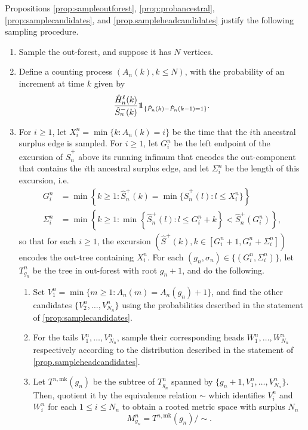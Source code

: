 Propositions \ref{prop:sampleoutforest}, \ref{prop:probancestral}, \ref{prop:samplecandidates}, and \ref{prop.sampleheadcandidates} justify the following sampling procedure.
\begin{enumerate}
    \item Sample the out-forest, and suppose it has $N$ vertices.
    \item Define a counting process $(A_n(k),k\leq N)$, with the probability of an increment at time $k$ given by $$\frac{\hat{H}_n^\ell(k)}{\hat{S}_n^-(k)}\one_{\{\hat{P}_n(k)-\hat{P}_n(k-1)=1\}}.$$
    \item For $i\geq 1$, let $X_i^n=\min\{k:A_n(k)=i\}$ be the time that the $i$th ancestral surplus edge is sampled. For $i\geq 1$, let $G_i^n$ be the left endpoint of the excursion of $\hat{S}^{+}_n$ above its running infimum that encodes the out-component that contains the $i$th ancestral surplus edge, and let $\Sigma_i^n$ be the length of this excursion, i.e. 
\begin{align*}G_i^n&=\min\left\{k\geq 1:\hat{S}^{+}_n(k)=\min\{\hat{S}^{+}_n(l):l\leq X_i^n\}\right\}\\
\Sigma_i^n&=\min\left\{k \geq 1: \min\left\{\hat{S}^{+}_n(l):l\leq G_i^n+k\right\} < \hat{S}^{+}_n(G^n_i)\right\},
\end{align*}
so that for each $i\geq 1$, the excursion $\left(\hat{S}^+(k),k\in [G_i^n+1,G_i^n+\Sigma_i^n]\right)$ encodes the out-tree containing $X_i^n$. For each $(g_n,\sigma_n)\in \{(G_i^n,\Sigma_i^n)\}$, let $T^n_{g_n}$ be the tree in out-forest with root $g_n+1$, and do the following.
    \begin{enumerate}
    \item \label{item.procedure3} Set $V_1^n=\min\{m\geq 1:A_n(m)=A_n(g_n)+1\}$, and find the other candidates $\{V_2^n,\dots ,V_{N_n}^n\}$ using the probabilities described in the statement of \cref{prop:samplecandidates}.
    \item \label{item.procedure4} For the tails $V_1^n,\dots, V_{N_n}^n$, sample their corresponding heads $W_1^n,\dots ,W_{N_n}^n$ respectively according to the distribution described in the statement of \cref{prop.sampleheadcandidates}.
    \item Let $T^{n,\mathrm{mk}}(g_n)$ be the subtree of $T^n_{g_n}$ spanned by $\{g_n+1,V_1^n,\dots ,V_{N_n}^n\}$. Then, quotient it by the equivalence relation $\sim$ which identifies $V_i^n$ and $W_i^n$ for each $1\leq i\leq N_n$ to obtain a rooted metric space with surplus $N_n$ $$M^n_{g_n}=T^{n,\mathrm{mk}}(g_n)/\sim.$$ 
\end{enumerate}
\end{enumerate}
